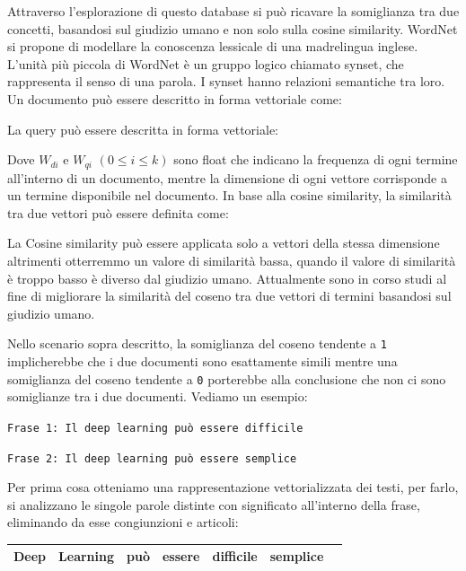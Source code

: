 Attraverso l’esplorazione di questo database si può ricavare la somiglianza tra due concetti, basandosi sul giudizio umano e non solo sulla cosine similarity. WordNet si propone di modellare la conoscenza lessicale di una madrelingua inglese. L’unità più piccola di WordNet è un gruppo logico chiamato synset, che rappresenta il senso di una parola. I synset hanno relazioni semantiche tra loro.
Un documento può essere descritto in forma vettoriale come:
\begin{center}
\end{center}
La query può essere descritta in forma vettoriale:
\begin{center}
\end{center}
Dove $W_{di}$  e  $W_{qi}$ $(0 \leq i \leq k)$ sono float che indicano la frequenza di ogni termine all’interno di un documento, mentre la dimensione di ogni vettore corrisponde a un termine disponibile nel documento.
In base alla cosine similarity, la similarità tra due vettori può essere definita come:
\begin{center}
\end{center}
La Cosine similarity può essere applicata solo a vettori della stessa dimensione altrimenti otterremmo un valore di similarità bassa, quando il valore di similarità è troppo basso è diverso dal giudizio umano. Attualmente sono in corso studi al fine di migliorare la similarità del coseno tra due vettori di termini basandosi sul giudizio umano.

Nello scenario sopra descritto, la somiglianza del coseno tendente a \texttt{1} implicherebbe che i due documenti sono esattamente simili mentre una somiglianza del coseno tendente a \texttt{0} porterebbe alla conclusione che non ci sono somiglianze tra i due documenti. Vediamo un esempio:

\begin{center}
\texttt{Frase 1: Il deep learning può essere difficile}

\texttt{Frase 2: Il deep learning può essere semplice}
\end{center}
Per prima cosa otteniamo una rappresentazione vettorializzata dei testi, per farlo, si analizzano le singole parole distinte con significato all'interno della frase, eliminando da esse congiunzioni e articoli:
\begin{table}[h]
    \centering
    \begin{tabular}{|c|c|c|c|c|c|c}
    \hline
         Deep & Learning & può & essere & difficile & semplice  \\
         \hline
    \end{tabular}
    \label{tab:tabvettorecosinesimilarity}
\end{table}

